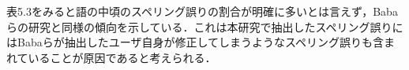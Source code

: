 表5.3をみると語の中頃のスペリング誤りの割合が明確に多いとは言えず，Baba らの研究と同様の傾向を示している．これは本研究で抽出したスペリング誤りにはBabaらが抽出したユーザ自身が修正してしまうようなスペリング誤り\cite{babaACL2012}も含まれていることが原因であると考えられる．

\begin{comment}
表5.4には英単語の長さに応じた単語内のスペリング誤りの位置の割合を示している．表5.4から英単語の長さが長くなるに応じて語頭と語尾の文字に対するスペリング誤りの割合が減っていることがわかる．
\end{comment}

\begin{comment}
\subsubsection{スペリング誤りの割合}
表7にそれぞれの観点での分析におけるスペリング誤りの割合を示す．この結果からタイピングゲームのような通常より素早くタイピングを行ったり，文字を書き写すような状況ではキーボードのキー配置が近いことが原因で起きる打鍵誤りや入力すべき文字を飛ばしてしまう誤りが起きることがわかった．また単語の語頭や語末でのスペリング誤りの割合は表7に示す．
\end{comment}

\begin{comment}
\subsubsection{同じ文字が連続している文字列に対するスペリング誤り}
\end{comment}

\begin{comment}
\subsubsection{アルファベットに対する数字のスペリング誤り}
表5.1にはその事例を示していて，ユーザがタイピングゲームにおいて英単語ideaを入力するときにユーザが入力した文字列が13ideaであった場合があった．これはそれぞれiと1，dと3の視覚的混同によって起きたものであると考えられる．しかし英単語を入力するという設定のタイピングゲームにおいて，数字を入力することは考えにくい．しかしタイピングゲームではハイスコアを競う設定がされているので，競うようなユーザが焦るような状況においては，視覚的混同のようなスペリング誤りを引き起こす要因が高まると考えられる．
\end{comment}

